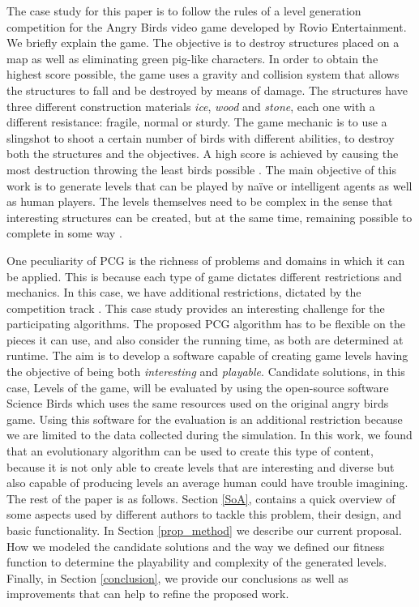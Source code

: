 \documentclass[conference]{IEEEtran}
\begin{document}
The case study for this paper is to follow the rules of a level generation
competition for the Angry Birds video game developed by Rovio Entertainment.
We briefly explain the game. %
The objective is to destroy structures placed
on a map as well as eliminating green pig-like characters. In order to
obtain the highest score possible, the game uses a gravity and collision
system that allows the structures to fall and be destroyed by means of
damage. The structures have  three different construction materials
\textit{ice}, \textit{wood} and \textit{stone}, each one with a different
resistance: fragile, normal or sturdy. The game
mechanic is to use a slingshot to shoot a certain number of birds with
different abilities, to destroy both the structures and the objectives. A
high score is achieved by causing the most destruction throwing the least
birds possible \cite{RovioEntertainmentCorporation2009}. The main objective
of this work is to generate levels that can be played by naïve or
intelligent agents as well as human players. The levels themselves need to
be complex in the sense that interesting structures can be created, but at
the same time, remaining possible to complete in some way \cite{Stephenson,
Stephenson2018}.

One peculiarity of PCG is the richness of problems and domains in which it can
be applied.  This is because each type of game dictates different restrictions
and mechanics. In this case, we have additional restrictions, dictated by the
competition track \cite{Renz}. %
This case study provides an interesting challenge
for the participating algorithms. The proposed PCG algorithm has to be flexible
on the pieces it can use, and also consider the running time, as both are
determined at runtime. The aim is to develop a software capable of creating game
levels having the objective of being both \textit{interesting} and
\textit{playable}. Candidate solutions, in this case, Levels of the game, will
be evaluated by using the open-source software Science Birds \cite{sciencebirds}
which uses the same resources used on the original angry birds game. Using this
software for the evaluation is an additional restriction because we are limited
to the data collected during the simulation.  
In this work, we found that an evolutionary algorithm can be used to create this
type of content, because it is not only able to create levels that are
interesting and diverse but also capable of producing levels an average human
could have trouble imagining. The rest of the paper is as follows. Section
\ref{SoA}, contains a quick overview of some aspects used by different authors
to tackle this problem, their design, and basic functionality. In Section
\ref{prop_method} we describe our current proposal.  How we modeled the
candidate solutions and the way we defined our fitness function to determine the
playability and complexity of the generated levels. Finally, in Section
\ref{conclusion}, we provide our conclusions as well as improvements that can
help to refine the proposed work. 
\end{document}
